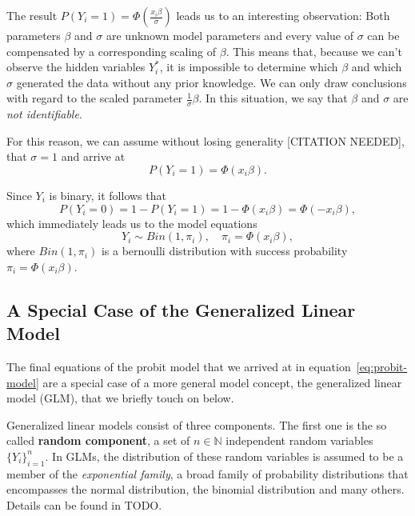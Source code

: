 The result $P(Y_i = 1) = \Phi\left(\frac{x_i \beta}{\sigma} \right)$
leads us to an interesting observation:
Both parameters $\beta$ and $\sigma$ are unknown model parameters and
every value of $\sigma$ can be compensated by a corresponding scaling
of $\beta$. This means that, because we can't observe the hidden variables $Y_i^\ast$,
it is impossible to determine which $\beta$ and which $\sigma$
generated the data without any prior knowledge.
We can only draw conclusions with regard to the
scaled parameter $\frac{1}{\sigma}\beta$.
In this situation, we say that $\beta$ and $\sigma$ are
\textit{not identifiable}.

For this reason, we can assume without losing generality [CITATION NEEDED],
that $\sigma = 1$ and arrive at
\begin{equation}
    P(Y_i = 1) = \Phi(x_i \beta).
\end{equation}

\noindent{}Since $Y_i$ is binary, it follows that
\begin{equation*}
    P(Y_i = 0) = 1 - P(Y_i = 1) = 1 - \Phi(x_i \beta) = \Phi(-x_i \beta),
\end{equation*}
which immediately leads us to the model equations
\begin{equation}
    \label{eq:probit-model}
    Y_i \sim Bin(1, \pi_i), \quad \pi_i = \Phi(x_i \beta),
\end{equation}
where $Bin(1, \pi_i)$ is a bernoulli distribution with success
probability $\pi_i = \Phi(x_i \beta)$.

\subsection{A Special Case of the Generalized Linear Model}

The final equations of the probit model that we arrived at
in equation~\ref{eq:probit-model} are a special case of a more
general model concept, the generalized linear model (GLM),
that we briefly touch on below.

Generalized linear models consist of three components.
The first one is the so called \textbf{random component},
a set of $n \in \mathbb{N}$ independent random variables $\{ Y_i \}_{i=1}^n$.
In GLMs, the distribution of these random variables is assumed
to be a member of the \textit{exponential family}, a broad family of
probability distributions that encompasses the normal distribution,
the binomial distribution and many others.
Details can be found in TODO.

